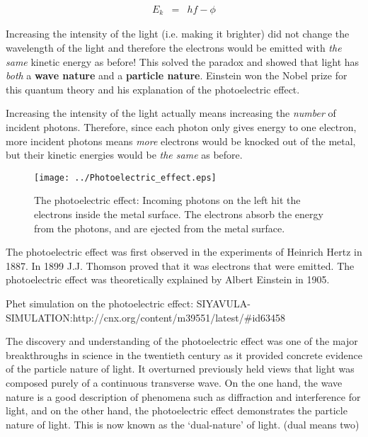 \begin{eqnarray*}
E_{k} &=& hf - \phi 
\end{eqnarray*} 

Increasing the intensity of the light (i.e. making it brighter) did not change the wavelength of the light and therefore the electrons would be emitted with \textit{the same} kinetic energy as before! This solved the paradox and showed that light has \textit{both} a \textbf{wave nature} and a \textbf{particle nature}. Einstein won the Nobel prize for this quantum theory and his explanation of the photoelectric effect. 

Increasing the intensity of the light actually means increasing the \textit{number} of incident photons. Therefore, since each photon only gives energy to one electron, more incident photons means \textit{more} electrons would be knocked out of the metal, but their kinetic energies would be \textit{the same} as before. 

\begin{figure}[!h]
\begin{center}
\texttt{[image: ../Photoelectric\_effect.eps]}
\caption{The photoelectric effect: Incoming photons on the left hit the electrons inside the metal surface. The electrons absorb the energy from the photons, and are ejected from the metal surface.}
\label{phot_el}
\end{center}
\end{figure}

\begin{IFact}
{The photoelectric effect was first observed in the experiments of Heinrich Hertz in 1887. In 1899 J.J. Thomson proved that it was electrons that were emitted. The photoelectric effect was theoretically explained by Albert Einstein in 1905.}
\end{IFact}
Phet simulation on the photoelectric effect: SIYAVULA-SIMULATION:http://cnx.org/content/m39551/latest/#id63458

 
The discovery and understanding of the photoelectric effect was one of the major breakthroughs in science in the twentieth century as it provided concrete evidence of the particle nature of light. It overturned previously held views that light was composed purely of a continuous transverse wave. On the one hand, the wave nature is a good description of phenomena such as diffraction and interference for light, and on the other hand, the photoelectric effect demonstrates the particle nature of light. This is now known as the `dual-nature' of light. (dual means two)

